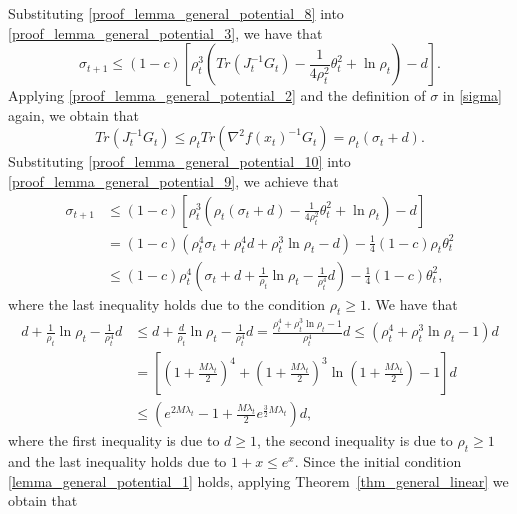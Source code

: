 \documentclass[11pt]{article}
\numberwithin{assumption}{section}
\numberwithin{remark}{section}
\numberwithin{theorem}{section}
\begin{document}
Substituting \eqref{proof_lemma_general_potential_8} into \eqref{proof_lemma_general_potential_3}, we have that
\begin{equation}\label{proof_lemma_general_potential_9}
\sigma_{t + 1} \leq (1 - c)\left[\rho_t^3 \left(Tr(J_t^{-1}G_t) - \frac{1}{4\rho_t^2}\theta_t^2 + \ln{\rho_t}\right) - d\right].
\end{equation}
Applying \eqref{proof_lemma_general_potential_2} and the definition of $\sigma$ in \eqref{sigma} again, we obtain that
\begin{equation}\label{proof_lemma_general_potential_10}
    Tr(J_t^{-1}G_t) \leq \rho_t Tr(\nabla^2{f(x_t)}^{-1}G_t) = \rho_t (\sigma_t + d).
\end{equation}
Substituting \eqref{proof_lemma_general_potential_10} into \eqref{proof_lemma_general_potential_9}, we achieve that
\begin{equation}\label{proof_lemma_general_potential_11}
\begin{split}
    \sigma_{t + 1} & \leq (1 - c)\left[\rho_t^3 \left(\rho_t (\sigma_t + d) - \frac{1}{4\rho_t^2}\theta_t^2 + \ln{\rho_t}\right) - d\right]\\
    & = (1 - c)(\rho_t^4\sigma_t + \rho_t^4 d + \rho_t^3 \ln{\rho_t} - d) - \frac{1}{4}(1 - c)\rho_t\theta_t^2\\
    & \leq (1 - c)\rho_t^4(\sigma_t + d + \frac{1}{\rho_t}\ln{\rho_t} - \frac{1}{\rho_t^4}d) - \frac{1}{4}(1 - c)\theta_t^2,
\end{split}
\end{equation}
where the last inequality holds due to the condition $\rho_t \geq 1$. We have that
\begin{equation}\label{proof_lemma_general_potential_12}
\begin{split}
    d + \frac{1}{\rho_t}\ln{\rho_t} - \frac{1}{\rho_t^4}d & \leq d + \frac{d}{\rho_t}\ln{\rho_t} - \frac{1}{\rho_t^4}d = \frac{\rho_t^4 + \rho_t^3\ln{\rho_t} - 1}{\rho_t^4}d \leq (\rho_t^4 + \rho_t^3\ln{\rho_t} - 1)d\\
    & = \left[(1 + \frac{M\lambda_t}{2})^4 + (1 + \frac{M\lambda_t}{2})^3\ln{(1 + \frac{M\lambda_t}{2})} - 1\right]d\\
    & \leq (e^{2M\lambda_t} - 1 + \frac{M\lambda_t}{2}e^{\frac{3}{2}M\lambda_t})d,
\end{split}
\end{equation}
where the first inequality is due to $d \geq 1$, the second inequality is due to $\rho_t \geq 1$ and the last inequality holds due to $1 + x \leq e^x$. Since the initial condition \eqref{lemma_general_potential_1} holds, applying Theorem~\ref{thm_general_linear} we obtain that
\end{document}
